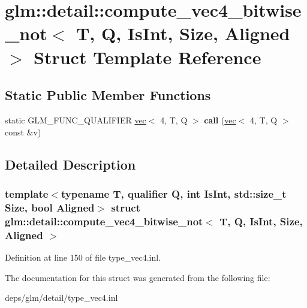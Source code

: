 \hypertarget{structglm_1_1detail_1_1compute__vec4__bitwise__not}{}\section{glm\+:\+:detail\+:\+:compute\+\_\+vec4\+\_\+bitwise\+\_\+not$<$ T, Q, Is\+Int, Size, Aligned $>$ Struct Template Reference}
\label{structglm_1_1detail_1_1compute__vec4__bitwise__not}
\subsection*{Static Public Member Functions}
\begin{DoxyCompactItemize}
\item 
\mbox{\label{structglm_1_1detail_1_1compute__vec4__bitwise__not_acbbd35ec67e0955a02cee35d6cfbb381}} 
static G\+L\+M\+\_\+\+F\+U\+N\+C\+\_\+\+Q\+U\+A\+L\+I\+F\+I\+ER \hyperlink{structglm_1_1vec}{vec}$<$ 4, T, Q $>$ {\bfseries call} (\hyperlink{structglm_1_1vec}{vec}$<$ 4, T, Q $>$ const \&v)
\end{DoxyCompactItemize}


\subsection{Detailed Description}
\subsubsection*{template$<$typename T, qualifier Q, int Is\+Int, std\+::size\+\_\+t Size, bool Aligned$>$\newline
struct glm\+::detail\+::compute\+\_\+vec4\+\_\+bitwise\+\_\+not$<$ T, Q, Is\+Int, Size, Aligned $>$}



Definition at line 150 of file type\+\_\+vec4.\+inl.



The documentation for this struct was generated from the following file\+:\begin{DoxyCompactItemize}
\item 
deps/glm/detail/type\+\_\+vec4.\+inl\end{DoxyCompactItemize}
